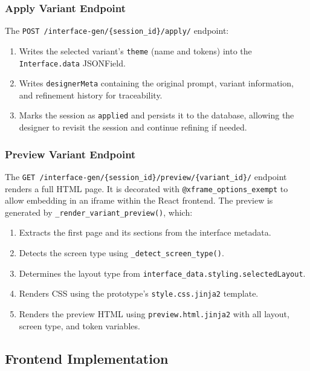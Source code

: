 \subsubsection{Apply Variant Endpoint}

The \texttt{POST /interface-gen/\{session\_id\}/apply/} endpoint:

\begin{enumerate}
    \item Writes the selected variant's \texttt{theme} (name and tokens) into the \texttt{Interface.data} JSONField.
    \item Writes \texttt{designerMeta} containing the original prompt, variant information, and refinement history for traceability.
    \item Marks the session as \texttt{applied} and persists it to the database, allowing the designer to revisit the session and continue refining if needed.
\end{enumerate}


\subsubsection{Preview Variant Endpoint}

The \texttt{GET /interface-gen/\{session\_id\}/preview/\{variant\_id\}/} endpoint renders a full HTML page. It is decorated with \texttt{@xframe\_options\_exempt} to allow embedding in an iframe within the React frontend. The preview is generated by \texttt{\_render\_variant\_preview()}, which:

\begin{enumerate}
    \item Extracts the first page and its sections from the interface metadata.
    \item Detects the screen type using \texttt{\_detect\_screen\_type()}.
    \item Determines the layout type from \texttt{interface\_data.styling.selectedLayout}.
    \item Renders CSS using the prototype's \texttt{style.css.jinja2} template.
    \item Renders the preview HTML using \texttt{preview.html.jinja2} with all layout, screen type, and token variables.
\end{enumerate}


\subsection{Frontend Implementation}


